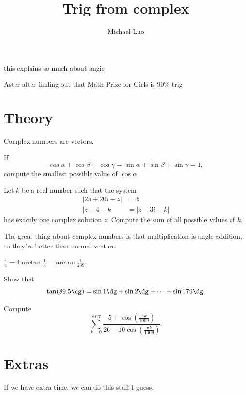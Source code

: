 \documentclass[11pt]{scrartcl}
\title{Trig from complex}
\author{Michael Luo}
\begin{document}
\maketitle

\epigraph{this explains so much about angie}{Aster after finding out that Math Prize for Girls is 90\% trig}

\section{Theory}

Complex numbers are vectors.
\begin{example}[HMMT 2018/A6]
    If
    \[\cos\alpha + \cos\beta + \cos\gamma = \sin\alpha + \sin\beta + \sin\gamma = 1,\]
    compute the smallest possible value of $\cos\alpha$.
\end{example}

\begin{example}[AIME I 2025/8]
    Let $k$ be a real number such that the system
    \begin{align*}
        \lvert 25+20i-z\rvert &= 5 \\
        \lvert z-4-k\rvert &= \lvert z-3i-k\rvert
    \end{align*}
    has exactly one complex solution $z$. Compute the sum of all possible values of $k$.
\end{example}

The great thing about complex numbers is that multiplication is angle addition, so they're better than normal vectors.

\begin{example}
    $\frac{\pi}4 = 4\arctan\frac15 - \arctan\frac1{239}$.
\end{example}

\begin{example}
    Show that
    \[\tan(89.5\dg) = \sin 1\dg + \sin 2\dg + \dots + \sin 179\dg.\]
\end{example}

\begin{example}[CMIMC 2018/A7]
    Compute
    \[\sum_{k = 0}^{2017}\frac{5 + \cos(\frac{\pi k}{1009})}{26 + 10\cos(\frac{\pi k}{1009})}.\]
\end{example}

\section{Extras}

If we have extra time, we can do this stuff I guess.
\end{document}
